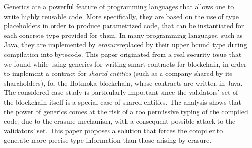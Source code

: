 Generics are a powerful feature of programming languages that allows one
to write highly reusable code.
%
More specifically, they are based on the use of type placeholders in order
to produce parametrized code, that can be instantiated for each
concrete type provided for them. 
%
In many programming languages, such as Java, they are implemented by
\emph{erasure}\ie replaced by their upper bound type during compilation into bytecode.
%
This paper originated from a real security issue that we found
while using generics for writing
smart contracts for blockchain, in order to implement
a contract for \emph{shared entities} (such as a company shared
by its shareholders),
for the Hotmoka blockchain, whose contracts are written in Java.
%
The considered case study is particularly important since
the validators' set of the blockchain itself is
a special case of shared entities.
The analysis shows that the power of generics comes at the risk of a too permissive
typing of the compiled code, due to the erasure mechanism, with a consequent possible attack
to the validators' set. This paper proposes a solution
that forces the compiler to generate more precise type information than
those arising by erasure.
